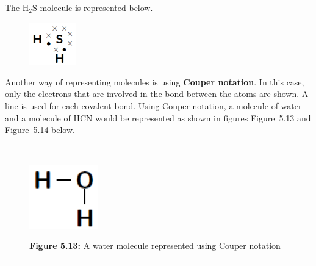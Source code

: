 {\begin{mdframed}[linewidth=4, leftmargin=40, rightmargin=40]
\begin{exercise}
\begin{enumerate}[noitemsep, label=\textbf{Step} \textbf{\arabic*}. ]
      \label{m38701*id140712}The $\mathrm{H}{}_{2}\mathrm{S}$ molecule is represented below.\par 
    \setcounter{subfigure}{0}
	\begin{figure}[H] %
    \begin{center}
    \label{m38701*uid20!!!underscore!!!media}\label{m38701*uid20!!!underscore!!!printimage}\includegraphics[width=2cm]{col11305.imgs/m38701_CG11C1_014.png} %
      \vspace{2pt}
    \vspace{.1in}
    \end{center}
 \end{figure}       
\end{enumerate}
    \end{exercise}
    \end{mdframed}
    }
    \noindent
      \label{m38701*id140737}Another way of representing molecules is using \textbf{Couper notation}. In this case, only the electrons that are involved in the bond between the atoms are shown. A line is used for each covalent bond. Using Couper notation, a molecule of water and a molecule of $\mathrm{HCN}$ would be represented as shown in figures Figure~5.13 and Figure~5.14 below.\par 
    \setcounter{subfigure}{0}
	\begin{figure}[H] %
    \begin{center}
    \rule[.1in]{\figurerulewidth}{.005in} \\
        \label{m38701*uid21!!!underscore!!!media}\label{m38701*uid21!!!underscore!!!printimage}\includegraphics[width=3cm]{col11305.imgs/m38701_CG11C1_015.png} %
      \vspace{2pt}
    \vspace{\rubberspace}\par \begin{cnxcaption}
	  \small \textbf{Figure 5.13: }A water molecule represented using Couper notation
	\end{cnxcaption}
    \vspace{.1in}
    \rule[.1in]{\figurerulewidth}{.005in} \\
    \end{center}
 \end{figure}       
